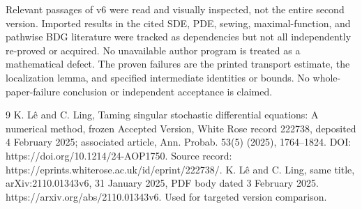 \documentclass[10pt]{article}
\begin{document}
Relevant passages of v6 were read and visually inspected, not the entire second version. Imported results in the cited SDE, PDE, sewing, maximal-function, and pathwise BDG literature were tracked as dependencies but not all independently re-proved or acquired. No unavailable author program is treated as a mathematical defect. The proven failures are the printed transport estimate, the localization lemma, and specified intermediate identities or bounds. No whole-paper-failure conclusion or independent acceptance is claimed.\par
9 K. Lê and C. Ling, Taming singular stochastic differential equations: A numerical method, frozen Accepted Version, White Rose record 222738, deposited 4 February 2025; associated article, Ann. Probab. 53(5) (2025), 1764–1824. DOI: https://doi.org/10.1214/24-AOP1750. Source record: https://eprints.whiterose.ac.uk/id/eprint/222738/. K. Lê and C. Ling, same title, arXiv:2110.01343v6, 31 January 2025, PDF body dated 3 February 2025. https://arxiv.org/abs/2110.01343v6. Used for targeted version comparison.\par
\end{document}
